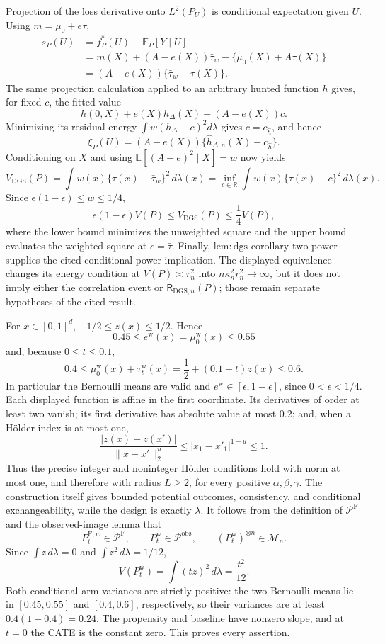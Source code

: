 Projection of the loss derivative onto \(L^2(P_U)\) is conditional expectation given \(U\).  Using \(m=\mu_0+e\tau\),
\[
\begin{aligned}
 s_P(U)
 &=f_P^*(U)-\mathbb E_P[Y\mid U]\\
 &=m(X)+(A-e(X))\bar\tau_w-\{\mu_0(X)+A\tau(X)\}\\
 &=(A-e(X))\{\bar\tau_w-\tau(X)\}.
\end{aligned}
\]
The same projection calculation applied to an arbitrary hunted function \(h\) gives, for fixed \(c\), the fitted value
\[
 h(0,X)+e(X)h_\Delta(X)+(A-e(X))c.
\]
Minimizing its residual energy \(\int w(h_\Delta-c)^2d\lambda\) gives \(c=c_{\widehat h}\), and hence
\[
 \xi_P(U)=(A-e(X))\{\widehat h_{\Delta,n}(X)-c_{\widehat h}\}.
\]
Conditioning on \(X\) and using \(\mathbb E[(A-e)^2\mid X]=w\) now yields
\[
 V_{\mathrm{DGS}}(P)
 =\int w(x)\{\tau(x)-\bar\tau_w\}^2\,d\lambda(x)
 =\inf_{c\in\mathbb R}\int w(x)\{\tau(x)-c\}^2\,d\lambda(x).
\]
Since \(\epsilon(1-\epsilon)\le w\le1/4\),
\[
 \epsilon(1-\epsilon)V(P)
 \le V_{\mathrm{DGS}}(P)
 \le \frac14V(P),
\]
where the lower bound minimizes the unweighted square and the upper bound evaluates the weighted square at \(c=\bar\tau\).  Finally, \(\mathrm{lem:dgs\mbox{-}corollary\mbox{-}two\mbox{-}power}\) supplies the cited conditional power implication.  The displayed equivalence changes its energy condition at \(V(P)\asymp r_n^2\) into \(n\kappa_n^2r_n^2\to\infty\), but it does not imply either the correlation event or \(\mathsf R_{\mathrm{DGS},n}(P)\); those remain separate hypotheses of the cited result.

For \(x\in[0,1]^d\), \(-1/2\le z(x)\le1/2\).  Hence
\[
 0.45\le e^{\mathrm w}(x)=\mu_0^{\mathrm w}(x)\le0.55
\]
and, because \(0\le t\le0.1\),
\[
 0.4\le \mu_0^{\mathrm w}(x)+\tau_t^{\mathrm w}(x)
 =\frac12+(0.1+t)z(x)\le0.6.
\]
In particular the Bernoulli means are valid and \(e^{\mathrm w}\in[\epsilon,1-\epsilon]\), since \(0<\epsilon<1/4\).  Each displayed function is affine in the first coordinate.  Its derivatives of order at least two vanish; its first derivative has absolute value at most \(0.2\); and, when a Hölder index is at most one,
\[
 \frac{|z(x)-z(x')|}{\|x-x'\|_2^u}
 \le |x_1-x'_1|^{1-u}\le1.
\]
Thus the precise integer and noninteger Hölder conditions hold with norm at most one, and therefore with radius \(L\ge2\), for every positive \(\alpha,\beta,\gamma\).  The construction itself gives bounded potential outcomes, consistency, and conditional exchangeability, while the design is exactly \(\lambda\).  It follows from the definition of \(\mathcal P^{\mathrm F}\) and the observed-image lemma that
\[
 P_t^{\mathrm F,w}\in\mathcal P^{\mathrm F},\qquad
 P_t^{\mathrm w}\in\mathcal P^{\mathrm{obs}},\qquad
 (P_t^{\mathrm w})^{\otimes n}\in\mathcal M_n.
\]
Since \(\int z\,d\lambda=0\) and \(\int z^2\,d\lambda=1/12\),
\[
 V(P_t^{\mathrm w})=\int (tz)^2\,d\lambda=\frac{t^2}{12}.
\]
Both conditional arm variances are strictly positive: the two Bernoulli means lie in \([0.45,0.55]\) and \([0.4,0.6]\), respectively, so their variances are at least \(0.4(1-0.4)=0.24\).  The propensity and baseline have nonzero slope, and at \(t=0\) the CATE is the constant zero.  This proves every assertion.

